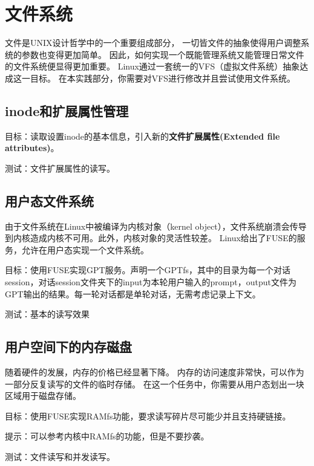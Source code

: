 \chapter{文件系统}
文件是UNIX设计哲学中的一个重要组成部分，
一切皆文件的抽象使得用户调整系统的参数也变得更加简单。
因此，如何实现一个既能管理系统又能管理日常文件的文件系统便显得更加重要。
Linux通过一套统一的VFS（虚拟文件系统）抽象达成这一目标。
在本实践部分，你需要对VFS进行修改并且尝试使用文件系统。

\section{inode和扩展属性管理}

目标：读取设置inode的基本信息，引入新的\textbf{文件扩展属性(Extended file attributes)}。

测试：文件扩展属性的读写。



\section{用户态文件系统}
由于文件系统在Linux中被编译为内核对象（kernel object），文件系统崩溃会传导到内核造成内核不可用。此外，内核对象的灵活性较差。
Linux给出了FUSE的服务，允许在用户态实现一个文件系统。

目标：使用FUSE实现GPT服务。声明一个GPTfs，其中的目录为每一个对话session，对话session文件夹下的input为本轮用户输入的prompt，output文件为GPT输出的结果。每一轮对话都是单轮对话，无需考虑记录上下文。

测试：基本的读写效果

\section{用户空间下的内存磁盘}
随着硬件的发展，内存的价格已经显著下降。
内存的访问速度非常快，可以作为一部分反复读写的文件的临时存储。
在这一个任务中，你需要从用户态划出一块区域用于磁盘存储。

目标：使用FUSE实现RAMfs功能，要求读写碎片尽可能少并且支持硬链接。

提示：可以参考内核中RAMfs的功能，但是不要抄袭。

测试：文件读写和并发读写。
